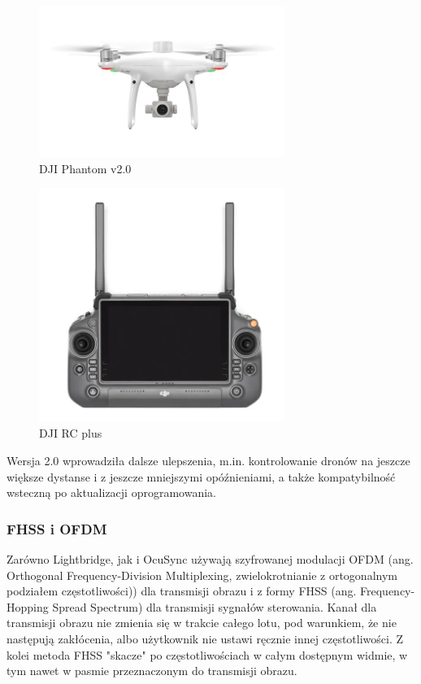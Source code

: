 \begin{figure}[!ht]
  \centering
  \includegraphics[width=8cm]{./Obrazy/dji-phantom-v2.jpg}
  \caption{DJI Phantom v2.0}
  \end{figure}
  

\begin{figure}[!ht]
  \centering
  \includegraphics[width=8cm]{./Obrazy/dji-rc-plus.png}
  \caption{DJI RC plus}
  \end{figure}
  

Wersja 2.0 wprowadziła dalsze ulepszenia, m.in. kontrolowanie dronów na jeszcze większe dystanse i z jeszcze mniejszymi opóźnieniami, a także kompatybilność wsteczną po aktualizacji oprogramowania.

\newpage
\subsubsection{FHSS i  OFDM}

Zarówno Lightbridge, jak i OcuSync używają szyfrowanej modulacji OFDM (ang. Orthogonal Frequency-Division Multiplexing, zwielokrotnianie z ortogonalnym podziałem częstotliwości)) dla transmisji obrazu i z formy FHSS (ang. Frequency-Hopping Spread Spectrum) dla transmisji sygnałów sterowania. Kanał dla transmisji obrazu nie zmienia się w trakcie całego lotu, pod warunkiem, że nie następują zakłócenia, albo użytkownik nie ustawi ręcznie innej częstotliwości. Z kolei metoda FHSS "skacze" po częstotliwościach w całym dostępnym widmie, w tym nawet w pasmie przeznaczonym do transmisji obrazu.\cite{FHSS-wiki} \cite{OFDM-wiki}

